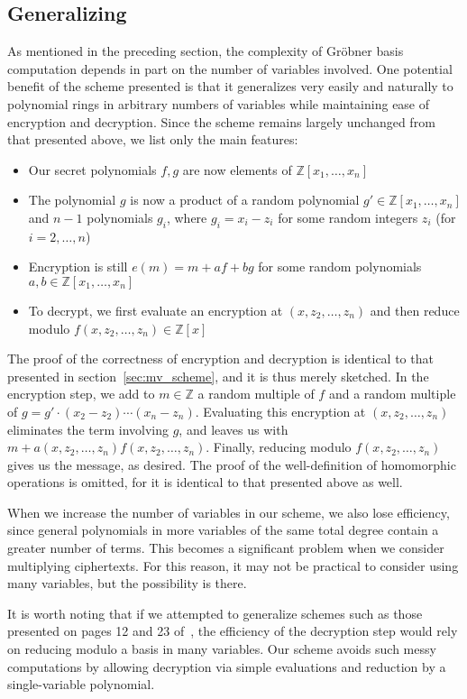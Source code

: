 \documentclass[11pt]{report}
\newcommand{\Z}{\mathbb{Z}}
\newcommand{\Zx}{\mathbb{Z}[x]}
\newcommand{\Zxn}{\mathbb{Z}[x_1,\ldots,x_n]}
\begin{document}
\subsection{Generalizing}
\label{sec:mv_generalizing}
As mentioned in the preceding section, the complexity of Gr\"obner basis computation depends in part on the number of variables involved. One potential benefit of the scheme presented is that it generalizes very easily and naturally to polynomial rings in arbitrary numbers of variables while maintaining ease of encryption and decryption. Since the scheme remains largely unchanged from that presented above, we list only the main features:

\begin{itemize}
\item Our secret polynomials $f,g$ are now elements of $\Zxn$
\item The polynomial $g$ is now a product of a random polynomial $g'\in \Zxn$ and $n-1$ polynomials $g_i$, where $g_i=x_i-z_i$ for some random integers $z_i$ (for $i=2,\dots,n$)
\item Encryption is still $e(m)=m+af+bg$ for some random polynomials $a,b\in \Zxn$
\item To decrypt, we first evaluate an encryption at $(x,z_2,\dots,z_n)$ and then reduce modulo $f(x,z_2,\dots,z_n) \in \Zx$
\end{itemize}

The proof of the correctness of encryption and decryption is identical to that presented in section~\ref{sec:mv_scheme}, and it is thus merely sketched. In the encryption step, we add to $m\in \Z$ a random multiple of $f$ and a random multiple of $g=g'\cdot(x_2-z_2)\cdots(x_n-z_n)$. Evaluating this encryption at $(x,z_2,\dots,z_n)$ eliminates the term involving $g$, and leaves us with $m+a(x,z_2,\dots,z_n)f(x,z_2,\dots,z_n)$. Finally, reducing modulo $f(x,z_2,\dots,z_n)$ gives us the message, as desired. The proof of the well-definition of homomorphic operations is omitted, for it is identical to that presented above as well.

When we increase the number of variables in our scheme, we also lose efficiency, since general polynomials in more variables of the same total degree contain a greater number of terms. This becomes a significant problem when we consider multiplying ciphertexts. For this reason, it may not be practical to consider using many variables, but the possibility is there.

It is worth noting that if we attempted to generalize schemes such as those presented on pages 12 and 23 of~\cite{polly-cracker-revisited}, the efficiency of the decryption step would rely on reducing modulo a basis in many variables. Our scheme avoids such messy computations by allowing decryption via simple evaluations and reduction by a single-variable polynomial.
\end{document}
